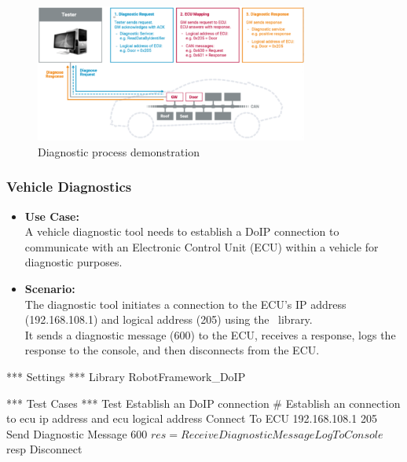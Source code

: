         \begin{figure}[htbp]
            \centering
            \includegraphics[width=0.8\textwidth]{./pictures/diagnostic-process-in-system.png}
            \caption{Diagnostic process demonstration}
            \label{fig:2.3}
        \end{figure}

        \subsubsection{Vehicle Diagnostics}
            \begin{itemize}
                \item\textbf{Use Case:}\\
                    A vehicle diagnostic tool needs to establish a DoIP connection to communicate with an Electronic Control Unit (ECU)
                    within a vehicle for diagnostic purposes.

                \item\textbf{Scenario:} \\
                    The diagnostic tool initiates a connection to the ECU's IP address (192.168.108.1) and logical address (205) using 
                    the \pkg\ library. \\
                    It sends a diagnostic message (600) to the ECU, receives a response, logs the response 
                    to the console, and then disconnects from the ECU.
            \end{itemize}

        \begin{robotcode}
*** Settings ***
Library    RobotFramework_DoIP

*** Test Cases ***
Test Establish an DoIP connection
    # Establish an connection to ecu ip address and ecu logical address
    Connect To ECU     192.168.108.1      205
    Send Diagnostic Message     600
    ${res}= Receive Diagnostic Message
    Log To Console    ${resp}
    Disconnect
        \end{robotcode}

